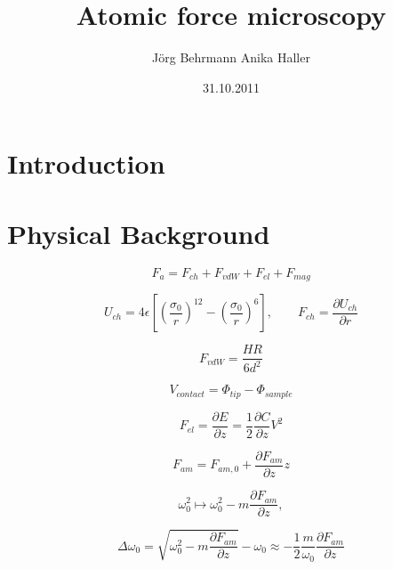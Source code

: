\documentclass{a4paper,twoside,11pt}[scrartcl]
\begin{document}
\title{Atomic force microscopy}
\author{J\"org Behrmann \qquad Anika Haller}
\date{31.10.2011}
\maketitle
\tableofcontents
\thispagestyle{empty}
\clearpage

\section{Introduction}



\section{Physical Background}

\begin{equation}
F_{a}=F_{ch}+F_{vdW}+F_{el}+F_{mag}
\end{equation}

\begin{equation}
U_{ch}=4\epsilon\left[\left(\frac{\sigma_{0}}{r}\right)^{12}-\left(\frac{\sigma_{0}}{r}\right)^{6}\right],\qquad F_{ch}=\frac{\partial U_{ch}}{\partial r}
\end{equation}

\begin{equation}
F_{vdW}=\frac{HR}{6d^{2}}
\end{equation}

\begin{equation}
V_{contact}=\Phi_{tip}-\Phi_{sample}
\end{equation}

\begin{equation}
F_{el}=\frac{\partial E}{\partial z}=\frac{1}{2}\frac{\partial C}{\partial z}V^{2}
\end{equation}

\begin{equation}
F_{am}=F_{am,0}+\frac{\partial F_{am}}{\partial z}z
\end{equation}

\begin{equation}
\omega_{0}^{2}\mapsto\omega_{0}^{2}-m\frac{\partial F_{am}}{\partial z},
\end{equation}

\begin{equation}
\Delta\omega_{0}=\sqrt{\omega_{0}^{2}-m\frac{\partial F_{am}}{\partial z}}-\omega_{0}\approx-\frac{1}{2}\frac{m}{\omega_{0}}\frac{\partial F_{am}}{\partial z}
\end{equation}
\end{document}
